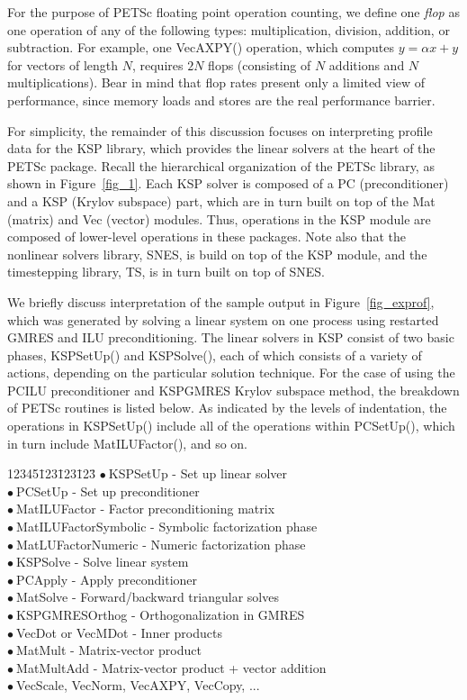 For the purpose of PETSc floating point operation counting, we define
one {\em flop} as one operation of any of the following types:
multiplication, division, addition, or subtraction.  For example, one
VecAXPY() operation, which computes $y = \alpha x + y$ for
vectors of length $N$, requires $2N$ flops (consisting of $N$
additions and $N$ multiplications).  Bear in mind that flop rates
present only a limited view of performance, since memory loads and stores are
the real performance barrier.

For simplicity, the remainder of this discussion focuses on
interpreting profile data for the KSP library, 
which provides the linear solvers at the heart of the
PETSc package.  Recall the hierarchical organization of the PETSc
library, as shown in Figure~\ref{fig_1}.  Each KSP solver 
is composed of a PC (preconditioner) and a KSP (Krylov
subspace) part, which are in turn built on top of the Mat 
(matrix) and Vec (vector) modules.  Thus, operations in the
KSP module are composed of lower-level operations in these
packages.  Note also that the nonlinear solvers library, SNES, 
is build on top of the KSP module, and the timestepping
library, TS, is in turn built on top of SNES.

We briefly discuss interpretation of the sample output in
Figure~\ref{fig_exprof}, which was generated by solving a linear
system on one process using restarted GMRES and ILU
preconditioning.  The linear solvers in KSP consist of two
basic phases, KSPSetUp() and KSPSolve(), each of which
consists of a variety of actions, depending on the particular
solution technique.
For the case of using the PCILU preconditioner and KSPGMRES
Krylov subspace method, the breakdown of PETSc routines is listed below.
As indicated by the levels of indentation, the
operations in KSPSetUp() include all of the operations within
PCSetUp(), which in turn include MatILUFactor(), and so on. 
\newcommand{\bu}{$\bullet \: $}
\begin{tabbing}
12345\=123\=123\=123\= \kill
\> \bu KSPSetUp - Set up linear solver\\
\>\> \bu PCSetUp - Set up preconditioner\\
\>\>\> \bu MatILUFactor - Factor preconditioning matrix\\
\>\>\>\> \bu MatILUFactorSymbolic - Symbolic factorization phase\\
\>\>\>\> \bu MatLUFactorNumeric - Numeric factorization phase\\
\> \bu KSPSolve - Solve linear system\\
\>\> \bu PCApply - Apply preconditioner\\
\>\>\> \bu MatSolve - Forward/backward triangular solves\\
\>\> \bu KSPGMRESOrthog - Orthogonalization in GMRES\\
\>\>\> \bu VecDot or VecMDot - Inner products\\
\>\> \bu MatMult - Matrix-vector product\\
\>\> \bu MatMultAdd - Matrix-vector product + vector addition\\
\>\> \bu  VecScale, VecNorm, VecAXPY, VecCopy, ...\\
\end{tabbing}

